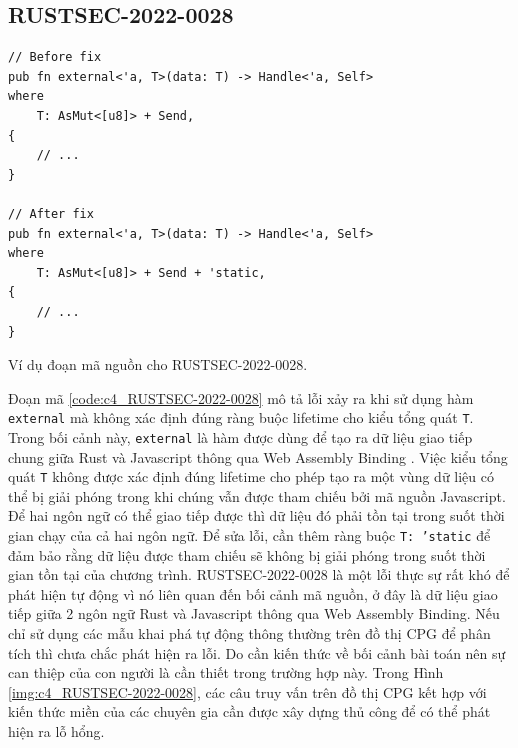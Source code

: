 \subsection{RUSTSEC-2022-0028}

\begin{listing}[H]
\begin{verbatim}
// Before fix
pub fn external<'a, T>(data: T) -> Handle<'a, Self>
where
    T: AsMut<[u8]> + Send,
{
    // ...
}

// After fix
pub fn external<'a, T>(data: T) -> Handle<'a, Self>
where
    T: AsMut<[u8]> + Send + 'static,
{
    // ...
}
\end{verbatim}
\caption{Ví dụ đoạn mã nguồn cho RUSTSEC-2022-0028.}
\label{code:c4_RUSTSEC-2022-0028}
\end{listing}

Đoạn mã \ref{code:c4_RUSTSEC-2022-0028} mô tả lỗi xảy ra khi sử dụng hàm \texttt{external} mà không xác định đúng ràng buộc lifetime cho kiểu tổng quát \texttt{T}.
Trong bối cảnh này, \texttt{external} là hàm được dùng để tạo ra dữ liệu giao tiếp chung giữa Rust và Javascript thông qua Web Assembly Binding \cite{ githubGitHubRustwasmwasmbindgen}.
Việc kiểu tổng quát \texttt{T} không được xác định đúng lifetime cho phép tạo ra một vùng dữ liệu có thể bị giải phóng trong khi chúng vẫn được tham chiếu bởi mã nguồn Javascript.
Để hai ngôn ngữ có thể giao tiếp được thì dữ liệu đó phải tồn tại trong suốt thời gian chạy của cả hai ngôn ngữ.
Để sửa lỗi, cần thêm ràng buộc \texttt{T: 'static} để đảm bảo rằng dữ liệu được tham chiếu sẽ không bị giải phóng trong suốt thời gian tồn tại của chương trình.
RUSTSEC-2022-0028 là một lỗi thực sự rất khó để phát hiện tự động vì nó liên quan đến bối cảnh mã nguồn, ở đây là dữ liệu giao tiếp giữa 2 ngôn ngữ Rust và Javascript thông qua Web Assembly Binding.
Nếu chỉ sử dụng các mẫu khai phá tự động thông thường trên đồ thị CPG để phân tích thì chưa chắc phát hiện ra lỗi.
Do cần kiến thức về bối cảnh bài toán nên sự can thiệp của con người là cần thiết trong trường hợp này.
Trong Hình \ref{img:c4_RUSTSEC-2022-0028}, các câu truy vấn trên đồ thị CPG kết hợp với kiến thức miền của các chuyên gia cần được xây dựng thủ công để có thể phát hiện ra lỗ hổng.

